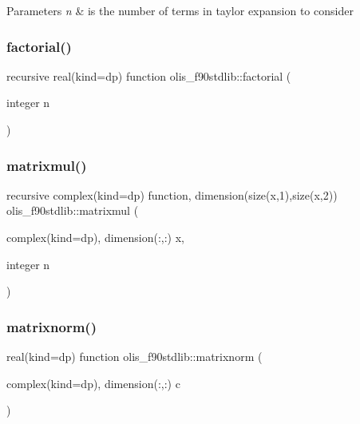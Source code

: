 \begin{DoxyParams}{Parameters}
{\em n} & is the number of terms in taylor expansion to consider \\
\hline
\end{DoxyParams}
\mbox{\label{namespaceolis__f90stdlib_ad0e4f304a609e1d8c088778344f1aa67}} 
\subsubsection{\texorpdfstring{factorial()}{factorial()}}
{\footnotesize\ttfamily recursive real(kind=dp) function olis\+\_\+f90stdlib\+::factorial (\begin{DoxyParamCaption}\item[{integer}]{n }\end{DoxyParamCaption})}

\mbox{\label{namespaceolis__f90stdlib_af70533a90b595522cd1bf47b37a2319d}} 
\subsubsection{\texorpdfstring{matrixmul()}{matrixmul()}}
{\footnotesize\ttfamily recursive complex(kind=dp) function, dimension(size(x,1),size(x,2)) olis\+\_\+f90stdlib\+::matrixmul (\begin{DoxyParamCaption}\item[{complex(kind=dp), dimension(\+:,\+:)}]{x,  }\item[{integer}]{n }\end{DoxyParamCaption})}

\mbox{\label{namespaceolis__f90stdlib_a43175b11cfecf961b5e6e597cfb2f848}} 
\subsubsection{\texorpdfstring{matrixnorm()}{matrixnorm()}}
{\footnotesize\ttfamily real(kind=dp) function olis\+\_\+f90stdlib\+::matrixnorm (\begin{DoxyParamCaption}\item[{complex(kind=dp), dimension(\+:,\+:)}]{c }\end{DoxyParamCaption})}



